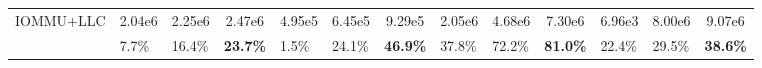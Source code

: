 \begin{table*}[ht!]
\begin{center}
{\begin{threeparttable}
\begin{tabular}{|l|ccc|ccc|ccc|ccc|}
\hline

IOMMU+LLC & 2.04e6 & 2.25e6 & 2.47e6 & 4.95e5 & 6.45e5 & 9.29e5 & 2.05e6 & 4.68e6 & 7.30e6 & 6.96e3 & 8.00e6 & 9.07e6 \\
    & \multicolumn{1}{l}{7.7\%}  & \multicolumn{1}{l}{16.4\%} & \multicolumn{1}{l|}{\textbf{23.7\%}} 
    & \multicolumn{1}{l}{1.5\%}  & \multicolumn{1}{l}{24.1\%} & \multicolumn{1}{l|}{\textbf{46.9\%}} 
    & \multicolumn{1}{l}{37.8\%} & \multicolumn{1}{l}{72.2\%} & \multicolumn{1}{l|}{\textbf{81.0\%}} 
    & \multicolumn{1}{l}{22.4\%} & \multicolumn{1}{l}{29.5\%} & \multicolumn{1}{l|}{\textbf{38.6\%}} \\ 

\hline

\end{tabular}


\begin{tablenotes}
\footnotesize

\end{tablenotes}

\end{threeparttable}
}

\label{tab:results}
\end{center}
\vspace{-2em}
\end{table*}
